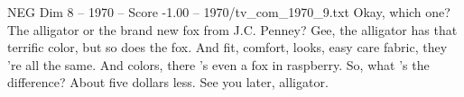 \begin{textsample}{NEG Dim 8 – 1970 – Score -1.00 – 1970/tv\_com\_1970\_9.txt}  \label{ex:f8_neg_016}
Okay, which one?
The alligator or the brand new fox from J.C.
Penney?
Gee, the alligator has that terrific color, but so does the fox.
And fit, comfort, looks, easy care fabric, they 're all the same.
And colors, there 's even a fox in raspberry.
So, what 's the difference?
About five dollars less.
See you later, alligator.

\end{textsample}
